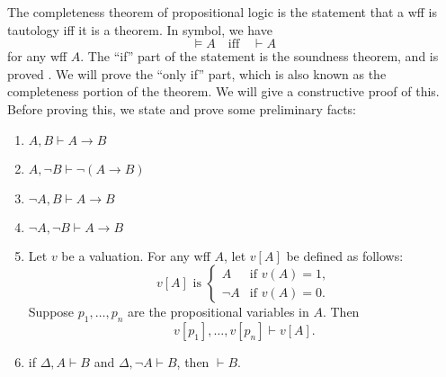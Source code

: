 \documentclass[12pt]{article}
\begin{document}
The completeness theorem of propositional logic is the statement that a wff is tautology iff it is a theorem.  In symbol, we have $$\models A \quad \mbox{iff} \quad \vdash A$$
for any wff $A$.  The ``if'' part of the statement is the soundness theorem, and is proved .  We will prove the ``only if'' part, which is also known as the completeness portion of the theorem.  We will give a constructive proof of this.  Before proving this, we state and prove some preliminary facts:

\begin{enumerate}
\item $A,B \vdash A\to B$
\item $A,\neg B \vdash \neg (A \to B)$
\item $\neg A,B \vdash A \to B$
\item $\neg A, \neg B \vdash A \to B$
\item Let $v$ be a valuation.  For any wff $A$, let $v[A]$ be defined as follows: 
\begin{displaymath}
v[A] \textrm{ is }  \left\{
\begin{array}{ll}
A & \textrm{if } v(A)=1,\\
\neg A & \textrm{if } v(A)=0.
\end{array}
\right.
\end{displaymath}
Suppose $p_1,\ldots,p_n$ are the propositional variables in $A$.  Then $$v[p_1],\ldots, v[p_n]\vdash v[A].$$
\item if $\Delta, A \vdash B$ and $\Delta, \neg A \vdash B$, then $\vdash B$.
\end{enumerate}
\end{document}
